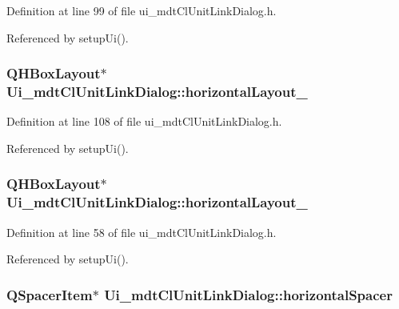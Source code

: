 Definition at line 99 of file ui\-\_\-mdt\-Cl\-Unit\-Link\-Dialog.\-h.



Referenced by setup\-Ui().

\hypertarget{class_ui__mdt_cl_unit_link_dialog_a167f00166284577a6a90fcfd432e1916}{
\subsubsection[{horizontal\-Layout\-\_\-8}]{\setlength{\rightskip}{0pt plus 5cm}Q\-H\-Box\-Layout$\ast$ Ui\-\_\-mdt\-Cl\-Unit\-Link\-Dialog\-::horizontal\-Layout\-\_}}\label{class_ui__mdt_cl_unit_link_dialog_a167f00166284577a6a90fcfd432e1916}


Definition at line 108 of file ui\-\_\-mdt\-Cl\-Unit\-Link\-Dialog.\-h.



Referenced by setup\-Ui().

\hypertarget{class_ui__mdt_cl_unit_link_dialog_a3c81feb5dea7610dda050d9a69ae7b99}{
\subsubsection[{horizontal\-Layout\-\_\-9}]{\setlength{\rightskip}{0pt plus 5cm}Q\-H\-Box\-Layout$\ast$ Ui\-\_\-mdt\-Cl\-Unit\-Link\-Dialog\-::horizontal\-Layout\-\_}}\label{class_ui__mdt_cl_unit_link_dialog_a3c81feb5dea7610dda050d9a69ae7b99}


Definition at line 58 of file ui\-\_\-mdt\-Cl\-Unit\-Link\-Dialog.\-h.



Referenced by setup\-Ui().

\hypertarget{class_ui__mdt_cl_unit_link_dialog_a2e167d28ef808fb7362980f139c56a12}{
\subsubsection[{horizontal\-Spacer}]{\setlength{\rightskip}{0pt plus 5cm}Q\-Spacer\-Item$\ast$ Ui\-\_\-mdt\-Cl\-Unit\-Link\-Dialog\-::horizontal\-Spacer}}\label{class_ui__mdt_cl_unit_link_dialog_a2e167d28ef808fb7362980f139c56a12}


